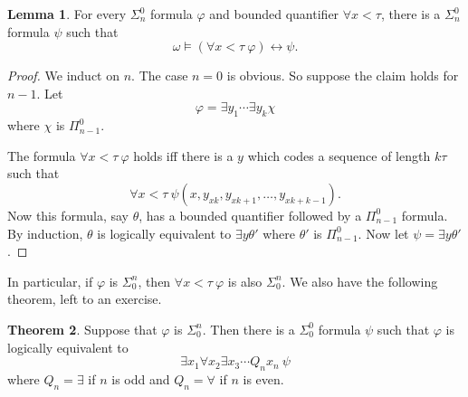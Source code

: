 \documentclass[12pt]{report}
\renewcommand{\iff}{\leftrightarrow}
\theoremstyle{definition}
\newtheorem{theorem}{Theorem}[chapter]
\newtheorem{lemma}[theorem]{Lemma}
\begin{document}
\begin{lemma}
For every $\Sigma_n^0$ formula $\varphi$ and bounded quantifier $\forall x < \tau$, there is a $\Sigma_n^0$ formula $\psi$ such that
$$\omega \models (\forall x<\tau~\varphi) \iff \psi.$$
\end{lemma}
\begin{proof}
We induct on $n$. The case $n = 0$ is obvious. So suppose the claim holds for $n - 1$. Let
$$\varphi = \exists y_1 \cdots \exists y_k \chi$$
where $\chi$ is $\Pi_{n-1}^0$.

The formula $\forall x < \tau~\varphi$ holds iff there is a $y$ which codes a sequence of length $k\tau$ such that
$$\forall x < \tau~\psi(x, y_{xk}, y_{xk + 1}, \dots, y_{xk+k-1}).$$
Now this formula, say $\theta$, has a bounded quantifier followed by a $\Pi_{n-1}^0$ formula.
By induction, $\theta$ is logically equivalent to $\exists y\theta'$ where $\theta'$ is $\Pi_{n-1}^0$.
Now let $\psi = \exists y\theta'$.
\end{proof}
In particular, if $\varphi$ is $\Sigma_0^n$, then $\forall x < \tau~\varphi$ is also $\Sigma_0^n$. We also have the following theorem, left to an exercise.
\begin{theorem}
Suppose that $\varphi$ is $\Sigma_0^n$. Then there is a $\Sigma_0^0$ formula $\psi$ such that $\varphi$ is logically equivalent to
$$\exists x_1 \forall x_2 \exists x_3 \cdots Q_n x_n ~\psi$$
where $Q_n = \exists$ if $n$ is odd and $Q_n = \forall$ if $n$ is even.
\end{theorem}
\end{document}

